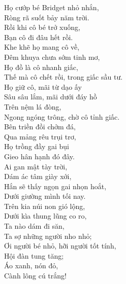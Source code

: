 \noindent
Họ cướp bé Bridget nhỏ nhắn,\\
\indent
Ròng rã suốt bảy năm trời.\\
Rồi khi cô bé trở xuống,\\
\indent
Bạn cô đi đâu hết rồi.\\
Khe khẽ họ mang cô về,\\
\indent
Đêm khuya chưa sớm tinh mơ,\\
Họ đồ là cô nhanh giấc,\\
\indent
Thế mà cô chết rồi, trong giấc sầu tư.\\
Họ giữ cô, mãi từ dạo ấy\\
\indent
Sâu sâu lắm, mãi dưới đáy hồ\\
Trên nệm lá đòng,\\
\indent
Ngong ngóng trông, chờ cô tỉnh giấc.\\

\noindent
Bên triền đồi chởm đá,\\
\indent
Qua mảng rêu trụi trơ,\\
Họ trồng đầy gai bụi\\
\indent
Gieo hân hạnh đó đây.\\
Ai gan mật tày trời,\\
\indent
Dám ác tâm giày xới,\\
Hắn sẽ thấy ngọn gai nhọn hoắt,\\
\indent
Dưới giường mình tối nay.\\

\noindent
Trên kia núi non gió lộng,\\
\indent
Dưới kìa thung lũng co ro,\\
Ta nào dám đi săn,\\
\indent
Ta sợ những người nho nhỏ;\\
Ơi người bé nhỏ, hỡi người tốt tính,\\
\indent
Hội đàn tung tăng;\\
Áo xanh, nón đỏ,\\
\indent
Cành lông cú trắng!\\
